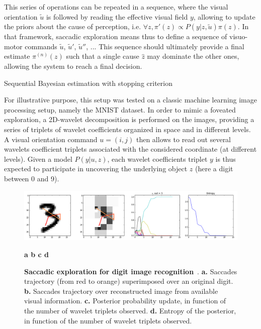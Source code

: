 \documentclass[12pt,twoside,openright]{article}
\begin{document}
	This series of operations can be repeated in a sequence, where the visual orientation $\tilde{u}$ is followed by reading the effective visual field $y$, allowing to update the priors about the cause of perception, i.e. $\forall z, \pi'(z) \propto  P(y|z,\tilde{u}) \pi(z)$. In that framework, saccadic exploration means thus to define a sequence of visuo-motor commands $\tilde{u}$, $\tilde{u}'$, $\tilde{u}''$, ... This sequence should ultimately provide a final estimate $\pi^{(n)}(z)$ such that a single cause $\hat{z}$ may dominate the other ones, allowing the system to reach a final decision.  
	
	{\color{magenta} Sequential Bayesian estimation with stopping criterion} 
	
	For illustrative purpose, this setup was tested on a classic machine learning image processing setup, namely the MNIST dataset. In order to mimic a foveated exploration, a 2D-wavelet decomposition is performed on the images, providing a series of triplets of wavelet coefficients organized in space and in different levels. A visual orientation command $u = (i,j)$ then allows to read out several wavelets coefficient triplets associated with the considered coordinate (at different levels). Given a model $P(y|u,z)$, each  wavelet coefficients triplet $y$ is thus expected to participate in uncovering the underlying object $z$ (here a digit between 0 and 9).

	\begin{figure}[t!]
		\centerline{
				\includegraphics[width = \linewidth]{img/figure.png} 
		}
		\centerline{\bf a \hspace{4cm} b \hspace{4cm} c \hspace{4cm} d}
		\caption{\footnotesize{{\bf Saccadic exploration for digit image recognition}~. {\bf a.} Saccades trajectory (from red to orange) superimposed over an original digit. {\bf b.} Saccades trajectory over reconstructed image from available visual information. {\bf c.} Posterior probability update, in function of the number of wavelet triplets observed. {\bf d.} Entropy of the posterior, in function of the number of wavelet triplets observed. } }
	\end{figure}
	
\end{document}
